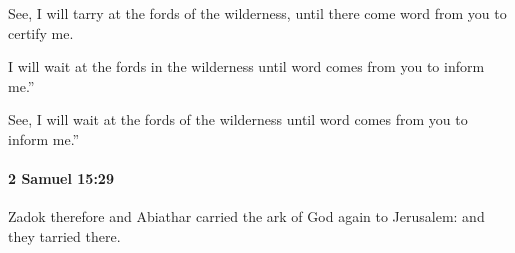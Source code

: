 			\begin{versebox}
					\item[BHS] 
					\item[ASV] See, I will tarry at the fords of the wilderness, until there come word from you to certify me.
					\item[NIV] I will wait at the fords in the wilderness until word comes from you to inform me.”
					\item[NRSV] See, I will wait at the fords of the wilderness until word comes from you to inform me.”
			\end{versebox}

		\paragraph{2 Samuel 15:29} %
			\label{2SAMUEL-15-29}

			Zadok therefore and Abiathar carried the ark of God again to Jerusalem: and they tarried there.

